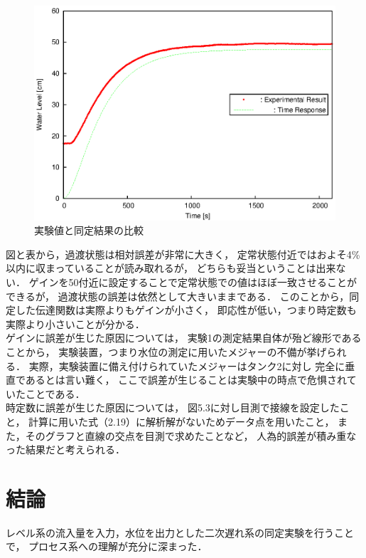 \documentclass[11pt,a4paper]{jsarticle}
\begin{document}
    \begin{figure}[b]
      \begin{center}
        \includegraphics[width=0.9\hsize]{./fig/data4dpt.eps}
      \end{center}
      \caption{実験値と同定結果の比較}
      \label{fig:data4}
    \end{figure}

    

    図と表から，過渡状態は相対誤差が非常に大きく，
    定常状態付近ではおよそ4\%以内に収まっていることが読み取れるが，
    どちらも妥当ということは出来ない．
    ゲインを50付近に設定することで定常状態での値はほぼ一致させることができるが，
    過渡状態の誤差は依然として大きいままである．
    このことから，同定した伝達関数は実際よりもゲインが小さく，
    即応性が低い，つまり時定数も実際より小さいことが分かる．\\

    ゲインに誤差が生じた原因については，
    実験1の測定結果自体が殆ど線形であることから，
    実験装置，つまり水位の測定に用いたメジャーの不備が挙げられる．
    実際，実験装置に備え付けられていたメジャーはタンク2に対し
    完全に垂直であるとは言い難く，
    ここで誤差が生じることは実験中の時点で危惧されていたことである．\\

    時定数に誤差が生じた原因については，
    図5.3に対し目測で接線を設定したこと，
    計算に用いた式（2.19）に解析解がないためデータ点を用いたこと，
    また，そのグラフと直線の交点を目測で求めたことなど，
    人為的誤差が積み重なった結果だと考えられる．\\

\section{結論}
  レベル系の流入量を入力，水位を出力とした二次遅れ系の同定実験を行うことで，
  プロセス系への理解が充分に深まった．
\end{document}

